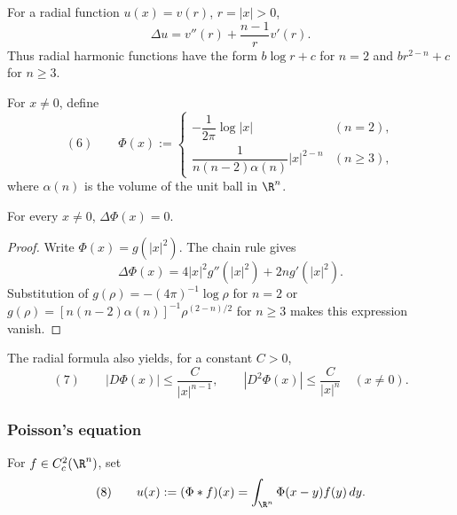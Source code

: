 For a radial function $u(x)=v(r)$, $r=|x|>0$,
$$\Delta u=v''(r)+\frac{n-1}{r}v'(r).$$
Thus radial harmonic functions have the form $b\log r+c$ for $n=2$ and
$br^{2-n}+c$ for $n\ge3$.

\begin{definition}
\label{def:fundamental-solution-laplace}
\leanok
For $x\ne0$, define
$$(6)\qquad
\Phi(x):=
\begin{cases}
-\dfrac{1}{2\pi}\log|x|&(n=2),\\[3pt]
\dfrac{1}{n(n-2)\alpha(n)}|x|^{2-n}&(n\ge3),
\end{cases}$$
where $\alpha(n)$ is the volume of the unit ball in $\R^n$.
\end{definition}

\begin{lemma}
\label{lem:laplace-fundamental-solution-harmonic}
\leanok
For every $x\ne0$, $\Delta\Phi(x)=0$.
\end{lemma}
\begin{proof}
\leanok
\sketch Write $\Phi(x)=g(|x|^2)$. The chain rule gives
$$\Delta\Phi(x)=4|x|^2g''(|x|^2)+2n g'(|x|^2).$$
Substitution of $g(\rho)=-(4\pi)^{-1}\log\rho$ for $n=2$ or
$g(\rho)=[n(n-2)\alpha(n)]^{-1}\rho^{(2-n)/2}$ for $n\ge3$ makes this
expression vanish.
\end{proof}

The radial formula also yields, for a constant $C>0$,
$$(7)\qquad
|D\Phi(x)|\le \frac{C}{|x|^{n-1}},
\qquad
|D^2\Phi(x)|\le \frac{C}{|x|^n}
\quad(x\ne0).$$

\subsubsection{Poisson's equation}
\label{sec:laplace-poissons-equation}

For $f\in C_c^2(\R^n)$, set
$$(8)\qquad u(x):=(\Phi*f)(x)=\int_{\R^n}\Phi(x-y)f(y)\,dy.$$

